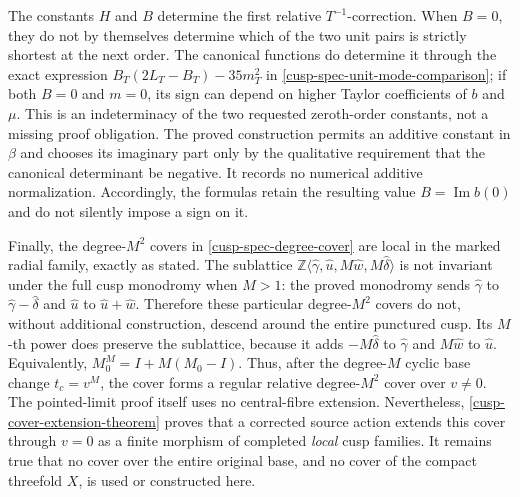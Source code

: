 The constants \(H\) and \(B\) determine the first relative
\(T^{-1}\)-correction.  When \(B=0\), they do not by themselves determine
which of the two unit pairs is strictly shortest at the next order.  The
canonical functions do determine it through the exact expression
\(B_T(2L_T-B_T)-35m_T^2\) in
\cref{cusp-spec-unit-mode-comparison}; if both \(B=0\) and \(m=0\), its sign
can depend on higher Taylor coefficients of \(b\) and \(\mu\).  This is an
indeterminacy of the two requested zeroth-order constants, not a missing
proof obligation.
The proved construction permits an additive constant in \(\beta\) and chooses
its imaginary part only by the qualitative requirement that the canonical
determinant be negative.  It records no numerical additive normalization.
Accordingly, the formulas retain the resulting value
\(B=\operatorname{Im}b(0)\) and do not silently impose a sign on it.

Finally, the degree-\(M^2\) covers in
\cref{cusp-spec-degree-cover} are local in the marked radial family, exactly
as stated.  The sublattice
\(\mathbb Z\langle\widehat\gamma,\widehat u,
M\widehat w,M\widehat\delta\rangle\) is not invariant under the full cusp
monodromy when \(M>1\): the proved monodromy sends
\(\widehat\gamma\) to \(\widehat\gamma-\widehat\delta\) and
\(\widehat u\) to \(\widehat u+\widehat w\).  Therefore these particular
degree-\(M^2\) covers do not, without additional construction, descend
around the entire punctured cusp.  Its \(M\)-th power does preserve the
sublattice, because it adds \(-M\widehat\delta\) to
\(\widehat\gamma\) and \(M\widehat w\) to \(\widehat u\).  Equivalently,
\(M_0^M=I+M(M_0-I)\).  Thus, after the degree-\(M\) cyclic base change
\(t_c=v^M\), the cover forms a regular relative degree-\(M^2\) cover over
\(v\ne0\).  The pointed-limit proof itself uses no central-fibre extension.
Nevertheless, \cref{cusp-cover-extension-theorem} proves that a corrected
source action extends this cover through \(v=0\) as a finite morphism of
completed \emph{local} cusp families.  It remains true that no cover over the
entire original base, and no cover of the compact threefold \(X\), is used or
constructed here.
